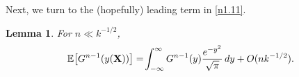 \documentclass[11pt]{amsart}
\newtheorem{lemma}[theorem]{Lemma}
\theoremstyle{remark}
\numberwithin{equation}{section}
\begin{document}
Next, we turn to the (hopefully) leading term in \eqref{n1.11}.
\begin{lemma}\label{nlem2} For $n\ll k^{-1/2}$,
\begin{equation*}
\Bbb E\bigl[G^{n-1}(y(\bold X))\bigr]=\!\int_{-\infty}^{\infty}G^{n-1}(y)\frac{e^{-y^2}}{\sqrt{\pi}}\,dy +O(nk^{-1/2}).
\end{equation*}
\end{lemma}
\end{document}
